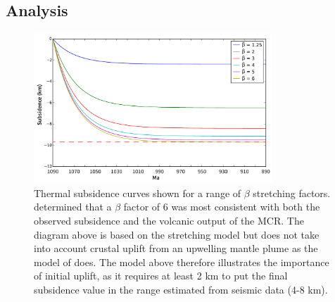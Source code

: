\documentclass[12pt,letterpaper]{article}
\begin{document}
\subsection*{Analysis}

\begin{figure}
\noindent\includegraphics[width=0.8\textwidth]{figures/general_thermal_sub.pdf}
\caption{\footnotesize{Thermal subsidence curves shown for a range of $\beta$ stretching factors. \cite{White1997a} determined that a $\beta$ factor of 6 was most consistent with both the observed subsidence and the volcanic output of the MCR. The diagram above is based on the \cite{McKenzie1978a} stretching model but does not take into account crustal uplift from an upwelling mantle plume as the model of \cite{White1997a} does. The model above therefore illustrates the importance of initial uplift, as it requires at least 2 km to put the final subsidence value in the range estimated from seismic data (4-8 km).}}
\label{fig:therm_sub}
\end{figure}




 
\end{document}
